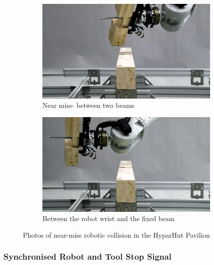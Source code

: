 \begin{figure}[!h]
    \centering
    \begin{subfigure}[b]{0.49\textwidth}
        \centering
        \includegraphics[width=\textwidth]{images/7b/img60.jpg}
        \caption{Near miss- between two beams}
        \label{fig:close-encounter-between-two-beams}
    \end{subfigure}
    \hfill
    \begin{subfigure}[b]{0.49\textwidth}
        \centering
        \includegraphics[width=\textwidth]{images/7b/img61.jpg}
        \caption{Between the robot wrist and the fixed beam}
    \end{subfigure}
    \caption{Photos of near-miss robotic collision in the HyparHut Pavilion}
    \label{fig:near-miss-robotic-collision-in-the-hyparhut-pavilion}
\end{figure}


\subsubsection{Synchronised Robot and Tool Stop Signal}
\label{subsubsection:exploration-4-synchronised-robot-and-tool-stop-signal}

